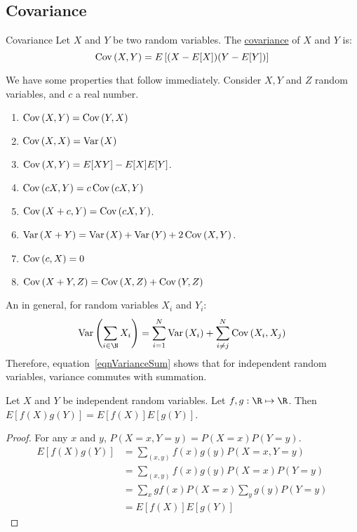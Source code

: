\documentclass[../Main.tex]{subfiles}
\begin{document}
\subsection{Covariance}
\begin{definition}{Covariance}
    Let $X$ and $Y$ be two random variables. The \underline{covariance} of $X$ and $Y$ is:
    \begin{equation}
        \operatorname{Cov}{(X, Y)} = E\left[(X - E[X])(Y - E[Y])\right]
        \label{eqnCovariance}
    \end{equation}
\end{definition}
We have some properties that follow immediately. Consider $X, Y$ and $Z$ random variables, and $c$ a real number.
\begin{enumerate}
    \item $\operatorname{Cov}{(X, Y)} = \operatorname{Cov}{(Y, X)}$
    \item $\operatorname{Cov}{(X, X)} = \operatorname{Var}{(X)}$
    \item $\operatorname{Cov}{(X, Y)} = E[XY] - E[X]E[Y]$.
    \item $\operatorname{Cov}{(cX, Y)} = c\operatorname{Cov}{(cX, Y)}$
    \item $\operatorname{Cov}{(X + c, Y)} = \operatorname{Cov}{(cX, Y)}$.
    \item $\operatorname{Var}{(X + Y)} = \operatorname{Var}{(X)} + \operatorname{Var}{(Y)} + 2\operatorname{Cov}{(X,Y)}$.
    \item $\operatorname{Cov}{(c, X)} = 0$
    \item $\operatorname{Cov}{(X + Y, Z)} = \operatorname{Cov}{(X, Z)} + \operatorname{Cov}{(Y, Z)}$
\end{enumerate}
An in general, for random variables $X_i$ and $Y_i$:
\begin{equation}
    \Var{\left(\sum_{i \in \N} X_i\right)} = \sum_{i=1}^N \Var{(X_i)} + \sum_{i \neq j}^N \Cov{(X_i, X_j)}
    \label{eqnVarianceSum}
\end{equation}
Therefore, equation~\ref{eqnVarianceSum} shows that for independent random variables, variance commutes with summation.
\begin{lemma}
    Let $X$ and $Y$ be independent random variables. Let $f, g : \R \mapsto \R$. Then $E[f(X)g(Y)] = E[f(X)]E[g(Y)]$.
\end{lemma}
\begin{proof}
    For any $x$ and $y$, $P(X = x, Y = y) = P(X = x)P(Y = y)$.
    \begin{align*}
        E[f(X)g(Y)] &= \sum_{(x, y)} f(x) g(y) P(X = x, Y = y) \\
        &= \sum_{(x, y)} f(x) g(y) P(X = x)P(Y = y) \\
        &= \sum_x gf(x) P(X = x) \sum_y g(y) P(Y = y) \\
        &= E[f(X)]E[g(Y)]
    \end{align*}
\end{proof}
\end{document}
